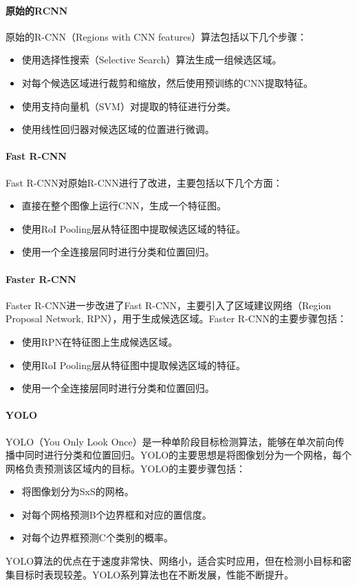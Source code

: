 \paragraph{原始的RCNN} 
原始的R-CNN（Regions with CNN features）算法包括以下几个步骤：
\begin{itemize}
    \item 使用选择性搜索（Selective Search）算法生成一组候选区域。
    \item 对每个候选区域进行裁剪和缩放，然后使用预训练的CNN提取特征。
    \item 使用支持向量机（SVM）对提取的特征进行分类。
    \item 使用线性回归器对候选区域的位置进行微调。
\end{itemize}
\paragraph{Fast R-CNN}
Fast R-CNN对原始R-CNN进行了改进，主要包括以下几个方面：
\begin{itemize}
    \item 直接在整个图像上运行CNN，生成一个特征图。
    \item 使用RoI Pooling层从特征图中提取候选区域的特征。
    \item 使用一个全连接层同时进行分类和位置回归。
\end{itemize}
\paragraph{Faster R-CNN}
Faster R-CNN进一步改进了Fast R-CNN，主要引入了区域建议网络（Region Proposal Network, RPN），用于生成候选区域。Faster R-CNN的主要步骤包括：
\begin{itemize}
    \item 使用RPN在特征图上生成候选区域。
    \item 使用RoI Pooling层从特征图中提取候选区域的特征。
    \item 使用一个全连接层同时进行分类和位置回归。
\end{itemize}

\paragraph{YOLO} YOLO（You Only Look Once）是一种单阶段目标检测算法，能够在单次前向传播中同时进行分类和位置回归。YOLO的主要思想是将图像划分为一个网格，每个网格负责预测该区域内的目标。YOLO的主要步骤包括：
\begin{itemize}
    \item 将图像划分为SxS的网格。
    \item 对每个网格预测B个边界框和对应的置信度。
    \item 对每个边界框预测C个类别的概率。
\end{itemize}
YOLO算法的优点在于速度非常快、网络小，适合实时应用，但在检测小目标和密集目标时表现较差。YOLO系列算法也在不断发展，性能不断提升。

